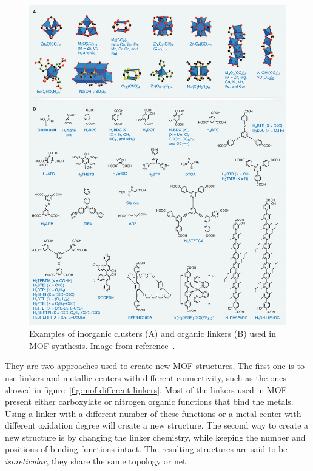 \documentclass[thesis]{subfiles}
\begin{document}
\begin{figure}[htp]
    \centering
    \includegraphics[width=\textwidth]{figures/cited/mof-building-blocks}
    \caption{Examples of inorganic clusters (A) and organic linkers (B) used in
    MOF synthesis. Image from reference~\cite{Furukawa2013}.}
    \label{fig:mof-building-blocks}
\end{figure}

They are two approaches used to create new MOF structures. The first one is to
use linkers and metallic centers with different connectivity, such as the ones
showed in figure~\ref{fig:mof-different-linkers}. Most of the linkers used in
MOF present either carboxylate or nitrogen organic functions that bind the
metals. Using a linker with a different number of these functions or a metal
center with different oxidation degree will create a new structure. The second
way to create a new structure is by changing the linker chemistry, while keeping
the number and positions of binding functions intact. The resulting structures
are said to be \emph{isoreticular}, \ie they share the same topology or net.
\end{document}
